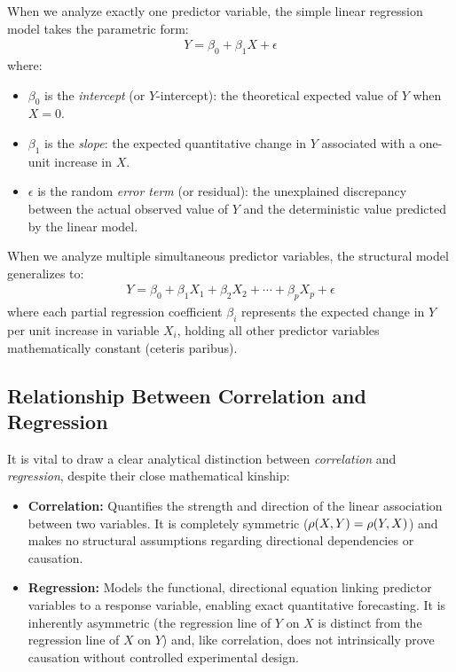 \begin{definicion}
	When we analyze exactly one predictor variable, the simple linear regression model takes the parametric form:
	\begin{align}
		Y = \beta_0 + \beta_1 X + \epsilon
	\end{align}
	where:
	\begin{itemize}
		\item $\beta_0$ is the \emph{intercept} (or $Y$-intercept): the theoretical expected value of $Y$ when $X = 0$.
		\item $\beta_1$ is the \emph{slope}: the expected quantitative change in $Y$ associated with a one-unit increase in $X$.
		\item $\epsilon$ is the random \emph{error term} (or residual): the unexplained discrepancy between the actual observed value of $Y$ and the deterministic value predicted by the linear model.
	\end{itemize}
\end{definicion}

\begin{definicion}
	When we analyze multiple simultaneous predictor variables, the structural model generalizes to:
	\begin{align}
		Y = \beta_0 + \beta_1 X_1 + \beta_2 X_2 + \cdots + \beta_p X_p + \epsilon
	\end{align}
	where each partial regression coefficient $\beta_i$ represents the expected change in $Y$ per unit increase in variable $X_i$, holding all other predictor variables mathematically constant (ceteris paribus).
\end{definicion}

\subsection{Relationship Between Correlation and Regression}

It is vital to draw a clear analytical distinction between \emph{correlation} and \emph{regression}, despite their close mathematical kinship:

\begin{itemize}
	\item \textbf{Correlation:} Quantifies the strength and direction of the linear association between two variables. It is completely symmetric ($\rho(X,Y) = \rho(Y,X)$) and makes no structural assumptions regarding directional dependencies or causation.
	\item \textbf{Regression:} Models the functional, directional equation linking predictor variables to a response variable, enabling exact quantitative forecasting. It is inherently asymmetric (the regression line of $Y$ on $X$ is distinct from the regression line of $X$ on $Y$) and, like correlation, does not intrinsically prove causation without controlled experimental design.
\end{itemize}

